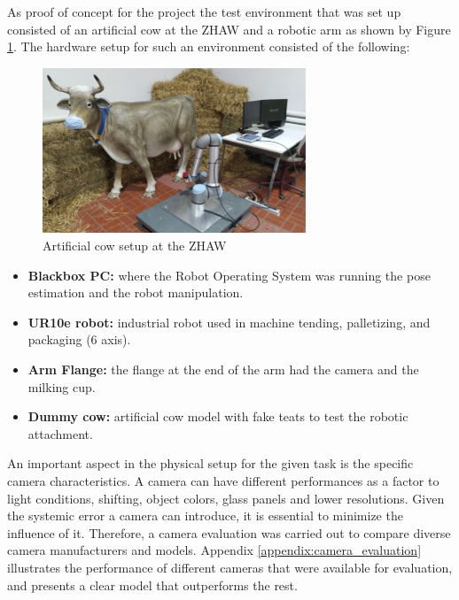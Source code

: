     As proof of concept for the project the test environment that was set up consisted of an artificial cow at the ZHAW and a robotic arm as shown by Figure \ref{fig:cow_setup}. The hardware setup for such an environment consisted of the following:
     \begin{figure}[h]
        \centering
        \includegraphics[width=0.7\textwidth]{images/cow_setup.png}
        \caption{Artificial cow setup at the ZHAW}
        \label{fig:cow_setup}
    \end{figure}
    
    \begin{itemize}
        \item \textbf{Blackbox PC:} where the Robot Operating System was running the pose estimation and the robot manipulation.
        \item \textbf{UR10e robot:} industrial robot used in machine tending, palletizing, and packaging (6 axis).
        \item \textbf{Arm Flange:} the flange at the end of the arm had the camera and the milking cup.
        \item \textbf{Dummy cow:} artificial cow model with fake teats to test the robotic attachment.
    \end{itemize}
   
    
    An important aspect in the physical setup for the given task is the specific camera characteristics. A camera can have different performances as a factor to light conditions, shifting, object colors, glass panels and lower resolutions. Given the systemic error a camera can introduce, it is essential to minimize the influence of it. Therefore, a camera evaluation was carried out to compare diverse camera manufacturers and models. Appendix \ref{appendix:camera_evaluation} illustrates the performance of different cameras that were available for evaluation, and presents a clear model that outperforms the rest. 

